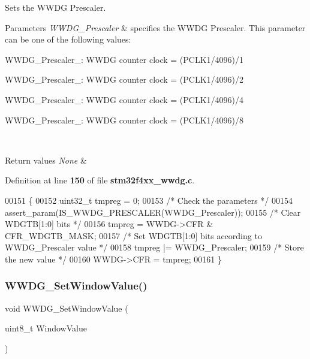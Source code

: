 Sets the W\+W\+DG Prescaler. 


\begin{DoxyParams}{Parameters}
{\em W\+W\+D\+G\+\_\+\+Prescaler} & specifies the W\+W\+DG Prescaler. This parameter can be one of the following values\+: \begin{DoxyItemize}
\item W\+W\+D\+G\+\_\+\+Prescaler\+\_\+: W\+W\+DG counter clock = (P\+C\+L\+K1/4096)/1 \item W\+W\+D\+G\+\_\+\+Prescaler\+\_\+: W\+W\+DG counter clock = (P\+C\+L\+K1/4096)/2 \item W\+W\+D\+G\+\_\+\+Prescaler\+\_\+: W\+W\+DG counter clock = (P\+C\+L\+K1/4096)/4 \item W\+W\+D\+G\+\_\+\+Prescaler\+\_\+: W\+W\+DG counter clock = (P\+C\+L\+K1/4096)/8 \end{DoxyItemize}
\\
\hline
\end{DoxyParams}

\begin{DoxyRetVals}{Return values}
{\em None} & \\
\hline
\end{DoxyRetVals}


Definition at line \textbf{ 150} of file \textbf{ stm32f4xx\+\_\+wwdg.\+c}.


\begin{DoxyCode}
00151 \{
00152   uint32\_t tmpreg = 0;
00153   \textcolor{comment}{/* Check the parameters */}
00154   assert_param(IS_WWDG_PRESCALER(WWDG\_Prescaler));
00155   \textcolor{comment}{/* Clear WDGTB[1:0] bits */}
00156   tmpreg = WWDG->CFR & CFR_WDGTB_MASK;
00157   \textcolor{comment}{/* Set WDGTB[1:0] bits according to WWDG\_Prescaler value */}
00158   tmpreg |= WWDG\_Prescaler;
00159   \textcolor{comment}{/* Store the new value */}
00160   WWDG->CFR = tmpreg;
00161 \}
\end{DoxyCode}
\mbox{\label{group__WWDG__Group1_gaf44a7bf8bf6b11b41cd89ff521fdd5a5}} 
\subsubsection{W\+W\+D\+G\+\_\+\+Set\+Window\+Value()}
{\footnotesize\ttfamily void W\+W\+D\+G\+\_\+\+Set\+Window\+Value (\begin{DoxyParamCaption}\item[{uint8\+\_\+t}]{Window\+Value }\end{DoxyParamCaption})}



